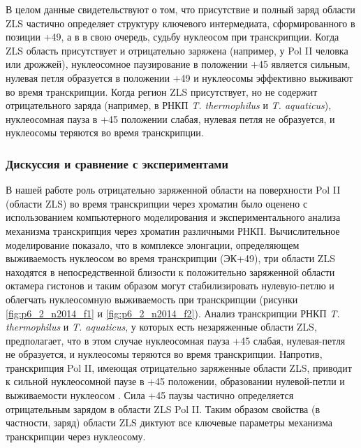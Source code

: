     В целом данные свидетельствуют о том, что присутствие и полный заряд области ZLS частично определяет структуру ключевого интермедиата, сформированного в позиции +49, а в в свою очередь, судьбу нуклеосом при транскрипции. Когда ZLS область присутствует и отрицательно заряжена (например, у Pol II человка или дрожжей), нуклеосомное паузирование в положении +45 является сильным, нулевая петля образуется в положении +49 и нуклеосомы эффективно выживают во время транскрипции. Когда регион ZLS присутствует, но не содержит отрицательного заряда (например, в РНКП \textit{T. thermophilus} и \textit{T. aquaticus}), нуклеосомная пауза в +45 положении слабая, нулевая петля не образуется, и нуклеосомы теряются во время транскрипции.
    
    
    
\subsubsection{Дискуссия и сравнение с экспериментами} %
    
    В нашей работе роль отрицательно заряженной области на поверхности Pol II (области ZLS) во время транскрипции через хроматин было оценено с использованием компьютерного моделирования и экспериментального анализа механизма транскрипция через хроматин различными РНКП. Вычислительное моделирование показало, что в комплексе элонгации, определяющем выживаемость нуклеосом во время транскрипции (ЭК+49), три области ZLS находятся в непосредственной близости к положительно заряженной области октамера гистонов и таким образом могут стабилизировать нулевую-петлю и облегчать нуклеосомную выживаемость при транскрипции (рисунки \ref{fig:p6_2_n2014_f1} и \ref{fig:p6_2_n2014_f2}). Анализ транскрипции РНКП \textit{T. thermophilus} и \textit{T. aquaticus}, у которых есть незаряженные области ZLS, предполагает, что в этом случае нуклеосомная пауза +45 слабая, нулевая-петля не образуется, и нуклеосомы теряются во время транскрипции. Напротив, транскрипция Pol II, имеющая отрицательно заряженные области ZLS, приводит к сильной нуклеосомной паузе в +45 положении, образовании нулевой-петли и выживаемости нуклеосом \cite{kireeva_nucleosome_2002,kulaeva_mechanism_2009,bondarenko_nucleosomes_2006}. Сила +45 паузы частично определяется отрицательным зарядом в области ZLS Pol II. Таким образом свойства (в частности, заряд) области ZLS диктуют все ключевые параметры механизма транскрипции через нуклеосому.
    
